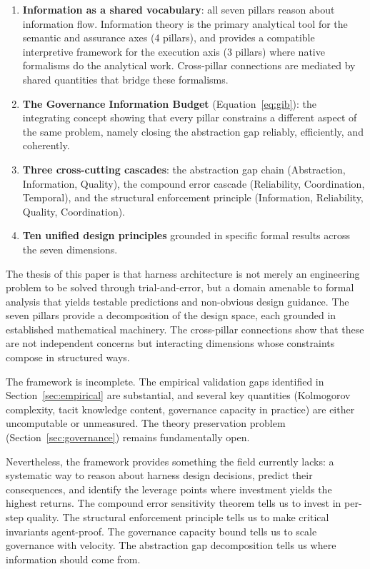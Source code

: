 \documentclass[11pt, a4paper, logo, copyright]{googledeepmind}
\begin{document}
\begin{enumerate}
    \item \textbf{Information as a shared vocabulary}: all seven pillars reason about information flow. Information theory is the primary analytical tool for the semantic and assurance axes (4 pillars), and provides a compatible interpretive framework for the execution axis (3 pillars) where native formalisms do the analytical work. Cross-pillar connections are mediated by shared quantities that bridge these formalisms.
    \item \textbf{The Governance Information Budget} (Equation~\ref{eq:gib}): the integrating concept showing that every pillar constrains a different aspect of the same problem, namely closing the abstraction gap reliably, efficiently, and coherently.
    \item \textbf{Three cross-cutting cascades}: the abstraction gap chain (Abstraction, Information, Quality), the compound error cascade (Reliability, Coordination, Temporal), and the structural enforcement principle (Information, Reliability, Quality, Coordination).
    \item \textbf{Ten unified design principles} grounded in specific formal results across the seven dimensions.
\end{enumerate}

The thesis of this paper is that harness architecture is not merely an engineering problem to be solved through trial-and-error, but a domain amenable to formal analysis that yields testable predictions and non-obvious design guidance. The seven pillars provide a decomposition of the design space, each grounded in established mathematical machinery. The cross-pillar connections show that these are not independent concerns but interacting dimensions whose constraints compose in structured ways.

The framework is incomplete. The empirical validation gaps identified in Section~\ref{sec:empirical} are substantial, and several key quantities (Kolmogorov complexity, tacit knowledge content, governance capacity in practice) are either uncomputable or unmeasured. The theory preservation problem (Section~\ref{sec:governance}) remains fundamentally open.

Nevertheless, the framework provides something the field currently lacks: a systematic way to reason about harness design decisions, predict their consequences, and identify the leverage points where investment yields the highest returns. The compound error sensitivity theorem tells us to invest in per-step quality. The structural enforcement principle tells us to make critical invariants agent-proof. The governance capacity bound tells us to scale governance with velocity. The abstraction gap decomposition tells us where information should come from.
\end{document}
